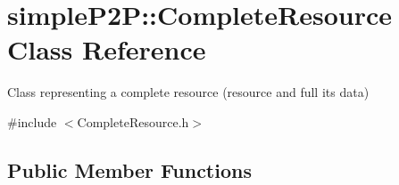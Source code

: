 \hypertarget{classsimpleP2P_1_1CompleteResource}{}\section{simple\+P2P\+:\+:Complete\+Resource Class Reference}
\label{classsimpleP2P_1_1CompleteResource}


Class representing a complete resource (resource and full its data)  




{\ttfamily \#include $<$Complete\+Resource.\+h$>$}

\subsection*{Public Member Functions}
